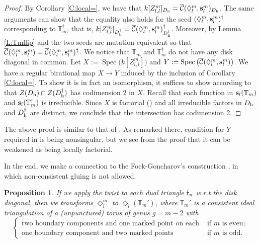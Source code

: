 \documentclass{amsart}
\newtheorem{proposition}[theorem]{Proposition}
\theoremstyle{definition}
\theoremstyle{remark}
\numberwithin{equation}{section}
\DeclareMathOperator{\Spec}{Spec}
\newcommand{\mc}[1]{\mathcal{#1}}
\newcommand{\mb}[1]{\mathbb{#1}}
\renewcommand{\b}[1]{\bold{#1}}
\newcommand{\br}[1]{\overline{#1}}
\renewcommand{\t}{{\sf t}}
\newcommand{\uca}{\br{\mc{C}}}
\newcommand{\zllm}{{Z_{l,l}^m}}
\begin{document}
\begin{proof} By Corollary \ref{C:local=}, we have that $k[\zllm]_{D_{\rm h}} = \uca(\Diamond_l^m,\b{s}_l^m)_{D_{\rm h}}$.
The same arguments can show that the equality also holds for the seed $(\Diamond_l^m,\b{s}_l^m)^\dagger$ corresponding to $\mb{T}_m^\dagger$, that is, $k[\zllm]_{D_{\rm h}^\dagger} = \uca(\Diamond_l^m,\b{s}_l^m)^\dagger_{D_{\rm h}^\dagger}$.	
	Moreover, by Lemma \ref{L:Tmflip} and \cite[Lemma 4.14]{FW} the two seeds are mutation-equivalent so that $\uca(\Diamond_l^m,\b{s}_l^m)=\uca(\Diamond_l^m,\b{s}_l^m)^\dagger$.
	We notice that $\mb{T}_m$ and $\mb{T}_m^\dagger$ do not have any disk diagonal in common.
	Let $X:=\Spec\big(k[\zllm]\big)$ and $Y:=\Spec \left(\uca(\Diamond_l^m,\b{s}_l^m) \right)$.
	We have a regular birational map $X \to Y$ induced by the inclusion of Corollary \ref{C:local=}.
	To show it is in fact an isomorphism, it suffices to show according to \cite[Corollary 1 of II.4.4]{Sh} that
	$Z(D_{\rm h}) \cap Z(D_{\rm h}^\dagger)$ has codimension 2 in $X$.
	Recall that each function in $\b{s}_l(\mb{T}_m)$ and $\b{s}_l(\mb{T}_m^\dagger)$ is irreducible.
	Since $X$ is factorial (\cite{PV}) and all irreducible factors in $D_{\rm h}$ and $D_{\rm h}^\dagger$ are distinct,
	we conclude that the intersection has codimension 2.
\end{proof}
\noindent The above proof is similar to that of \cite[Theorem 4.15]{FW}.
As remarked there, condition for $Y$ required in \cite[Corollary 1 of II.4.4]{Sh} is being nonsingular, 
but we see from the proof that it can be weakened as being locally factorial.


In the end, we make a connection to the Fock-Goncharov's construction \cite{FG}, in which non-consistent gluing is not allowed.
\begin{proposition} If we apply the twist to each dual triangle $\check{\t}_n$ w.r.t the disk diagonal, then we transforms $\Diamond_l^m$ to $\Diamond_l(\mb{T}_{m}')$,
where $\mb{T}_{m}'$ is a consistent ideal triangulation of a (unpunctured) torus of genus $g=m-2$ with 
$$\begin{cases} \text{two boundary components and one marked point on each} & \text{ if $m$ is even};\\
\text{one boundary component and two marked points} & \text{ if $m$ is odd}.
\end{cases}$$
\end{proposition}
\end{document}
